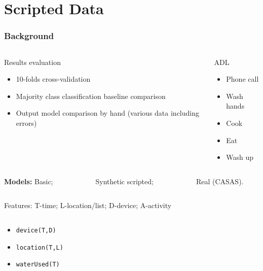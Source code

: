 \documentclass[10pt]{beamer}
\begin{document}
\section{Scripted Data}

\begin{frame}
  \frametitle{Background}

  \begin{columns}
    \begin{column}{8cm}
      \begin{block}{Results evaluation}
      \begin{itemize}
        \item 10-folds cross-validation
        \item Majority class classification baseline comparison
        \item Output model comparison by hand (various data including errors)
      \end{itemize}
      \end{block}
    \end{column}

    \begin{column}{3cm}
      \begin{block}{ADL}
      \begin{itemize}
        \item Phone call
        \item Wash hands
        \item Cook
        \item Eat
        \item Wash up
      \end{itemize}
      \end{block}
    \end{column}
  \end{columns}

\textbf{Models:} Basic;~~~~~~~~~~~~Synthetic scripted;~~~~~~~~~~~~Real (CASAS).

  \begin{columns}

    \begin{column}{8cm}
      \begin{block}{Features: T-time; L-location/list; D-device; A-activity}

      \begin{columns}
        \hspace*{2em}\begin{column}{4cm}
        \begin{itemize}
          \item \texttt{device(T,D)}
          \item \texttt{location(T,L)}
          \item \texttt{waterUsed(T)}


\end{itemize}
\end{column}
\end{columns}
\end{block}
\end{column}
\end{columns}
\end{frame}
\end{document}
